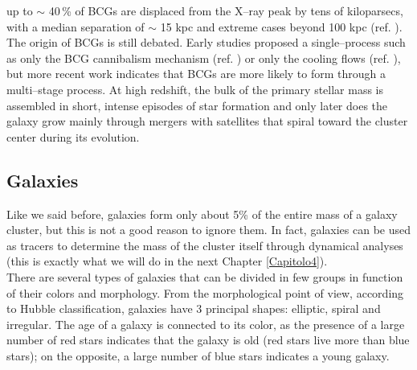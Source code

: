 up to $\sim$ 40\,\% of BCGs are displaced from the X–ray peak by
tens of kiloparsecs, with a median separation of $\sim$ 15 kpc and
extreme cases beyond 100 kpc (ref. \cite{De_Propris_2020}).\\
The origin of BCGs is still debated. Early studies proposed a single–process such as only the BCG cannibalism mechanism (ref. \cite{BCG_Cannibalism_Ostriker_&_Hausman_1977}) or only the cooling flows (ref. \cite{Cooling_flow_Cowie_&_Binney_1977}), but more recent work indicates that BCGs are more likely to form through a multi–stage process.
At high redshift, the bulk of the primary stellar mass is assembled in short, intense episodes of star formation and only later does the galaxy grow mainly through mergers with satellites that spiral toward the cluster center during its evolution.

\subsection{Galaxies}
Like we said before, galaxies form only about 5\% of the entire mass of a galaxy cluster, but this is not a good reason to ignore them. In fact, galaxies can be used as tracers to determine the mass of the cluster itself through dynamical analyses (this is exactly what we will do in the next Chapter \ref{Capitolo4}).\\
There are several types of galaxies that can be divided in few groups in function of their colors and morphology. From the morphological point of view, according to Hubble classification, galaxies have 3 principal shapes: elliptic, spiral and irregular.
The age of a galaxy is connected to  its color, as the presence of a large number of red stars indicates that the galaxy is old (red stars live more than blue stars); on the opposite, a large number of blue stars indicates a young galaxy.

